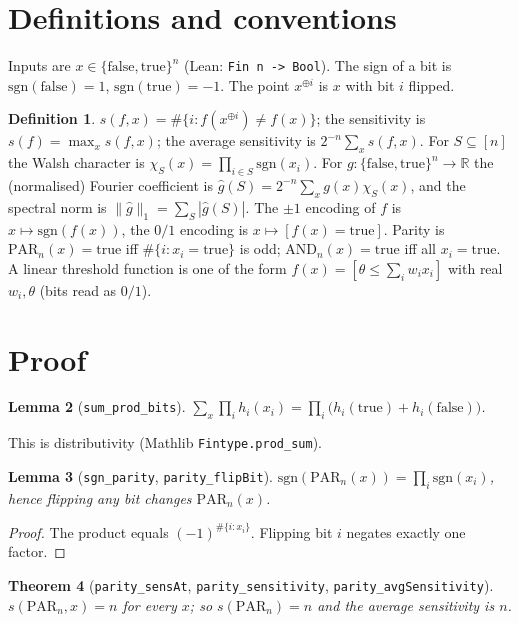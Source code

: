\documentclass[11pt]{article}
\newtheorem{theorem}{Theorem}
\newtheorem{lemma}[theorem]{Lemma}
\theoremstyle{definition}
\newtheorem{definition}[theorem]{Definition}
\begin{document}
\section{Definitions and conventions}
Inputs are $x\in\{\mathrm{false},\mathrm{true}\}^n$ (Lean: \texttt{Fin n -> Bool}). The sign of a
bit is $\mathrm{sgn}(\mathrm{false})=1$, $\mathrm{sgn}(\mathrm{true})=-1$. The point $x^{\oplus i}$
is $x$ with bit $i$ flipped.
\begin{definition}
$s(f,x)=\#\{i : f(x^{\oplus i})\ne f(x)\}$; the sensitivity is $s(f)=\max_x s(f,x)$; the average
sensitivity is $2^{-n}\sum_x s(f,x)$.
For $S\subseteq[n]$ the Walsh character is $\chi_S(x)=\prod_{i\in S}\mathrm{sgn}(x_i)$. For
$g:\{\mathrm{false},\mathrm{true}\}^n\to\mathbb R$ the (normalised) Fourier coefficient is
$\hat g(S)=2^{-n}\sum_x g(x)\chi_S(x)$, and the spectral norm is
$\|\hat g\|_1=\sum_{S}|\hat g(S)|$. The $\pm1$ encoding of $f$ is $x\mapsto \mathrm{sgn}(f(x))$,
the $0/1$ encoding is $x\mapsto[f(x)=\mathrm{true}]$.
Parity is $\mathrm{PAR}_n(x)=\mathrm{true}$ iff $\#\{i:x_i=\mathrm{true}\}$ is odd;
$\mathrm{AND}_n(x)=\mathrm{true}$ iff all $x_i=\mathrm{true}$. A linear threshold function is one
of the form $f(x)=[\theta\le\sum_i w_i x_i]$ with real $w_i,\theta$ (bits read as $0/1$).
\end{definition}

\section{Proof}
\begin{lemma}[\texttt{sum\_prod\_bits}]
$\sum_x\prod_i h_i(x_i)=\prod_i\big(h_i(\mathrm{true})+h_i(\mathrm{false})\big)$.
\end{lemma}
This is distributivity (Mathlib \texttt{Fintype.prod\_sum}).

\begin{lemma}[\texttt{sgn\_parity}, \texttt{parity\_flipBit}]
$\mathrm{sgn}(\mathrm{PAR}_n(x))=\prod_i\mathrm{sgn}(x_i)$, hence flipping any bit changes
$\mathrm{PAR}_n(x)$.
\end{lemma}
\begin{proof}
The product equals $(-1)^{\#\{i:x_i\}}$. Flipping bit $i$ negates exactly one factor.
\end{proof}

\begin{theorem}[\texttt{parity\_sensAt}, \texttt{parity\_sensitivity}, \texttt{parity\_avgSensitivity}]
$s(\mathrm{PAR}_n,x)=n$ for every $x$; so $s(\mathrm{PAR}_n)=n$ and the average sensitivity is $n$.
\end{theorem}
\end{document}
